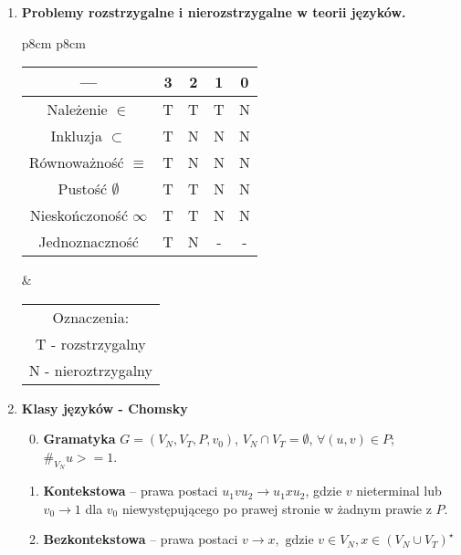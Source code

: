 \documentclass[12pt]{article}
\begin{document}
\begin{enumerate}
        \item \textbf{Problemy rozstrzygalne i nierozstrzygalne w teorii języków.}
        \begin{center}
            \begin{tabular}{p{8cm} p{8cm}}
                \begin{tabular}{c | c c c c}
                    ---                     & 3 & 2 & 1 & 0 \\ [0.5ex]
                    \hline
                    Należenie $\in$         & T & T & T & N \\
                    \hline
                    Inkluzja $\subset$      & T & N & N & N \\
                    \hline
                    Równoważność $\equiv$   & T & N & N & N \\
                    \hline
                    Pustość $\emptyset$     & T & T & N & N \\
                    \hline
                    Nieskończoność $\infty$ & T & T & N & N \\
                    \hline
                    Jednoznaczność          & T & N & - & - \\ [1ex]
                \end{tabular}
                &
                \begin{tabular}{c}
                    Oznaczenia:       \\
                    T - rozstrzygalny \\
                    N - nieroztrzygalny
                \end{tabular}
            \end{tabular}
        \end{center}

        \item \textbf{Klasy języków - Chomsky}
        \begin{enumerate}[noitemsep, label=\arabic*]
            \setcounter{enumii}{-1}
            \item \textbf{Gramatyka} $G=(V_N,V_T,P,v_0)$, $V_N \cap V_T = \emptyset$, $\forall (u,v)\in P$; $\#_{V_N} u >= 1$.

            \item \textbf{Kontekstowa} -- prawa postaci $u_1 v u_2 \rightarrow u_1 x u_2$, gdzie
            $v$ nieterminal lub $v_0 \rightarrow 1$ dla $v_0$ niewystępującego po prawej stronie w żadnym prawie z $P$.

            \item \textbf{Bezkontekstowa} -- prawa postaci
            $v \rightarrow x, \text{ gdzie } v \in V_N, x \in (V_N \cup V_T)^\star$


\end{enumerate}
\end{enumerate}
\end{document}
